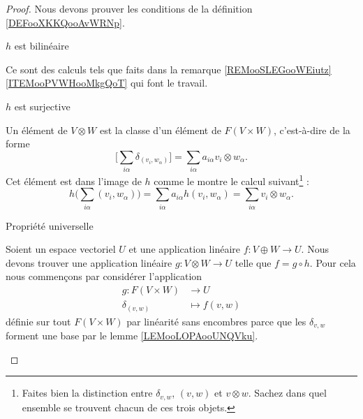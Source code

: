 \begin{proof}
    Nous devons prouver les conditions de la définition \ref{DEFooXKKQooAvWRNp}. 
    
    \begin{subproof}
        \item[\( h\) est bilinéaire]

            Ce sont des calculs tels que faits dans la remarque \ref{REMooSLEGooWEiutz}\ref{ITEMooPVWHooMkgQoT} qui font le travail.

        \item[\(h \) est surjective]
    
            Un élément de \( V\otimes W\) est la classe d'un élément de \( F(V\times W)\), c'est-à-dire de la forme
            \begin{equation}
                \big[ \sum_{i\alpha}\delta_{(v_i,w_{\alpha})} \big]=\sum_{i\alpha}a_{i\alpha}v_i\otimes w_{\alpha}.
            \end{equation}
            Cet élément est dans l'image de \( h\) comme le montre le calcul suivant\footnote{Faites bien la distinction entre \( \delta_{v,w}\), \( (v,w)\) et \( v\otimes w\). Sachez dans quel ensemble se trouvent chacun de ces trois objets.} :
            \begin{equation}
                h\big( \sum_{i\alpha}(v_i,w_{\alpha}) \big)=\sum_{i\alpha}a_{i\alpha}h(v_i,w_{\alpha})=\sum_{i\alpha}v_i\otimes w_{\alpha}.
            \end{equation}

        \item[Propriété universelle]

            Soient un espace vectoriel \( U\) et une application linéaire \( f\colon V\oplus W\to U \). Nous devons trouver une application linéaire \( g\colon V\otimes W\to U\) telle que \( f=g\circ h\). Pour cela nous commençons par considérer l'application
            \begin{equation}
                \begin{aligned}
                    g\colon F(V\times W)&\to U \\
                    \delta_{(v,w)}&\mapsto f(v,w) 
                \end{aligned}
            \end{equation}
            définie sur tout \( F(V\times W)\) par linéarité sans encombres parce que les \( \delta_{v,w}\) forment une base par le lemme \ref{LEMooLOPAooUNQVku}.


\end{subproof}
\end{proof}

